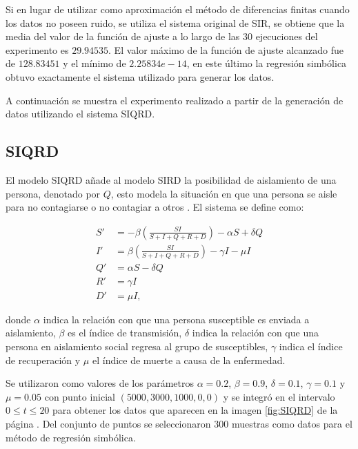 Si en lugar de utilizar como aproximación el método de diferencias finitas cuando los datos no poseen ruido, se utiliza el sistema original de SIR, se obtiene que la media del valor de la función de ajuste a lo largo de las 30 ejecuciones del experimento es $29.94535$. El valor máximo de la función de ajuste alcanzado fue de $128.83451$ y el mínimo de $2.25834e-14$, en este último la regresión simbólica obtuvo exactamente el sistema utilizado para generar los datos.

A continuación se muestra el experimento realizado a partir de la generación de datos utilizando el sistema SIQRD.

\subsection{SIQRD}

El modelo SIQRD añade al modelo SIRD la posibilidad de aislamiento de una persona, denotado por $Q$, esto modela la situación en que una persona se aisle para no contagiarse o no contagiar a otros \cite{molter2021mathematical}. El sistema se define como:

\begin{align*}
    S' & = -\beta (\frac{S I}{S + I + Q + R + D}) - \alpha S + \delta Q \\
    I' & = \beta (\frac{S I}{S + I + Q + R + D}) - \gamma I - \mu I     \\
    Q' & = \alpha S - \delta Q                                          \\
    R' & = \gamma I                                                     \\
    D' & = \mu I,
\end{align*}

donde $\alpha$ indica la relación con que una persona susceptible es enviada a aislamiento, $\beta$ es el índice de transmisión, $\delta$ indica la relación con que una persona en aislamiento social regresa al grupo de susceptibles, $\gamma$ indica el índice de recuperación y $\mu$ el índice de muerte a causa de la enfermedad.

Se utilizaron como valores de los parámetros $\alpha = 0.2$, $\beta = 0.9$, $\delta = 0.1$, $\gamma = 0.1$ y $\mu = 0.05$ con punto inicial $(5000, 3000, 1000, 0, 0)$ y se integró en el intervalo $0 \leq t \leq 20$ para obtener los datos que aparecen en la imagen \ref{fig:SIQRD} de la página \pageref{fig:SIQRD}. Del conjunto de puntos se seleccionaron 300 muestras como datos para el método de regresión simbólica.

